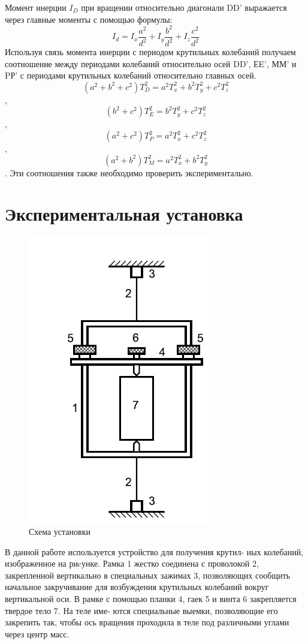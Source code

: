 \documentclass[a4paper,12pt]{article} %
\begin{document}
Момент инерции $I_{D}$ при вращении относительно диагонали DD' выражается
 через главные моменты с помощью формулы:
\begin{equation}
    I_{d}=I_{x}\frac{a^2}{d^2}+I_{y}\frac{b^2}{d^2}+I_{z}\frac{c^2}{d^2}
\end{equation}
Используя связь момента инерции с периодом крутильных колебаний
получаем соотношение между периодами колебаний относительно осей DD', ЕE',
ММ' и PР' с периодами крутильных колебаний относительно главных осей.
$$(a^2+b^2+c^2)T^2_{D}=a^2 T^2_{x}+b^2 T^2_{y}+c^2 T^2_{z}$$,
$$(b^2+c^2)T^2_{E}=b^2 T^2_{y}+c^2 T^2_{z}$$,
$$(a^2+c^2)T^2_{P}=a^2 T^2_{x}+c^2 T^2_{z}$$,
$$(a^2+b^2)T^2_{M}=a^2 T^2_{x}+b^2 T^2_{y}$$.
Эти соотношения также необходимо проверить экспериментально.

\section{Экспериментальная установка}

\begin{figure}[!h]
    \begin{center}
        \includegraphics[scale=1]{ystanovka}
        \caption{Схема установки}
        \label{graphic1}
    \end{center}
\end{figure}

В данной работе используется устройство для получения крутил-
ных колебаний, изображенное на риcунке. Рамка 1 жестко соединена
с проволокой 2, закрепленной вертикально в специальных зажимах
3, позволяющих сообщить начальное закручивание для возбуждения
крутильных колебаний вокруг вертикальной оси. В рамке с помощью
планки 4, гаек 5 и винта 6 закрепляется твердое тело 7. На теле име-
ются специальные выемки, позволяющие его закрепить так, чтобы ось
вращения проходила в теле под различными углами через центр масс.
\end{document}
